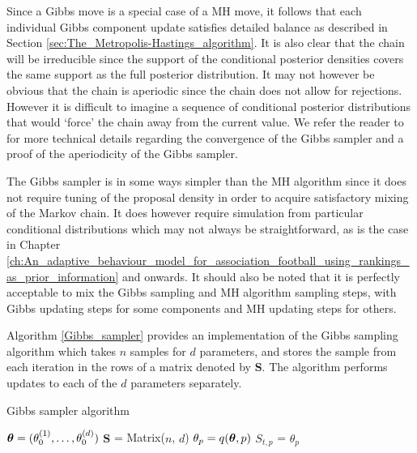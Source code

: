 Since a Gibbs move is a special case of a \gls{MH} move, it follows that each individual Gibbs component update
satisfies detailed balance as described in Section \ref{sec:The_Metropolis-Hastings_algorithm}. It is also clear that
the chain will be irreducible since the support of the conditional posterior densities covers the same support as the
full posterior distribution. It may not however be obvious that the chain is aperiodic since the chain does not allow
for rejections. However it is difficult to imagine a sequence of conditional posterior distributions that would `force'
the chain away from the current value. We refer the reader to \cite{roberts1994} for more technical details regarding
the convergence of the Gibbs sampler and a proof of the aperiodicity of the Gibbs sampler.

The Gibbs sampler is in some ways simpler than the \gls{MH} algorithm since it does not require tuning of the proposal
density in order to acquire satisfactory mixing of the Markov chain. It does however require simulation from particular
conditional distributions which may not always be straightforward, as is the case in Chapter
\ref{ch:An_adaptive_behaviour_model_for_association_football_using_rankings_as_prior_information} and onwards. It should
also be noted that it is perfectly acceptable to mix the Gibbs sampling and \gls{MH} algorithm sampling steps, with
Gibbs updating steps for some components and \gls{MH} updating steps for others.

Algorithm \ref{Gibbs_sampler} provides an implementation of the Gibbs sampling algorithm which takes \(n\) samples for
\(d\) parameters, and stores the sample from each iteration in the rows of a matrix denoted by \(\boldsymbol{S}\). The
algorithm performs updates to each of the \(d\) parameters separately.
\begin{algorithm}
\caption{\label{Gibbs_sampler} Gibbs sampler algorithm} 
\begin{algorithmic}[1]

\State \(\boldsymbol{\theta} = (\theta_0^{(1)}, \ldots, \theta_{0}^{(d)})\)
\State \(\boldsymbol{S}\) = Matrix(\(n\), \(d\))
    \State \(\theta_p = q(\boldsymbol{\theta}, p)\)
    \State \(S_{t, p}\) = \(\theta_p\)
  \EndFor
\EndFor
\EndProcedure

\Statex

  \State {}
\EndFunction

\end{algorithmic}
\end{algorithm}

